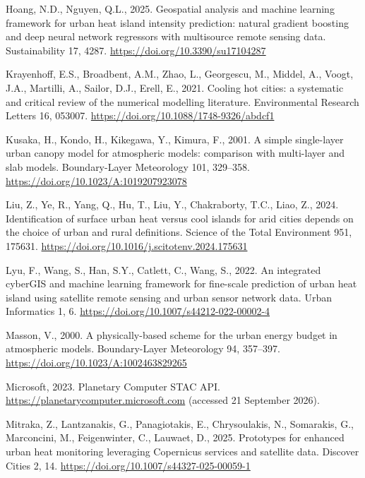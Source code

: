 \documentclass[preprint,12pt,authoryear]{elsarticle}
\begin{document}
\begin{thebibliography}{}
Hoang, N.D., Nguyen, Q.L., 2025. Geospatial analysis and machine learning
framework for urban heat island intensity prediction: natural gradient
boosting and deep neural network regressors with multisource remote
sensing data. Sustainability 17, 4287.
\url{https://doi.org/10.3390/su17104287}

Krayenhoff, E.S., Broadbent, A.M., Zhao, L., Georgescu, M., Middel, A.,
Voogt, J.A., Martilli, A., Sailor, D.J., Erell, E., 2021. Cooling hot
cities: a systematic and critical review of the numerical modelling
literature. Environmental Research Letters 16, 053007.
\url{https://doi.org/10.1088/1748-9326/abdcf1}

Kusaka, H., Kondo, H., Kikegawa, Y., Kimura, F., 2001. A simple
single-layer urban canopy model for atmospheric models: comparison with
multi-layer and slab models. Boundary-Layer Meteorology 101, 329--358.
\url{https://doi.org/10.1023/A:1019207923078}

Liu, Z., Ye, R., Yang, Q., Hu, T., Liu, Y., Chakraborty, T.C., Liao, Z.,
2024. Identification of surface urban heat versus cool islands for arid
cities depends on the choice of urban and rural definitions. Science of
the Total Environment 951, 175631.
\url{https://doi.org/10.1016/j.scitotenv.2024.175631}

Lyu, F., Wang, S., Han, S.Y., Catlett, C., Wang, S., 2022. An integrated
cyberGIS and machine learning framework for fine-scale prediction of
urban heat island using satellite remote sensing and urban sensor network
data. Urban Informatics 1, 6.
\url{https://doi.org/10.1007/s44212-022-00002-4}

Masson, V., 2000. A physically-based scheme for the urban energy budget in
atmospheric models. Boundary-Layer Meteorology 94, 357--397.
\url{https://doi.org/10.1023/A:1002463829265}

Microsoft, 2023. Planetary Computer STAC API.
\url{https://planetarycomputer.microsoft.com} (accessed 21 September 2026).

Mitraka, Z., Lantzanakis, G., Panagiotakis, E., Chrysoulakis, N.,
Somarakis, G., Marconcini, M., Feigenwinter, C., Lauwaet, D., 2025.
Prototypes for enhanced urban heat monitoring leveraging Copernicus
services and satellite data. Discover Cities 2, 14.
\url{https://doi.org/10.1007/s44327-025-00059-1}


\end{thebibliography}
\end{document}
